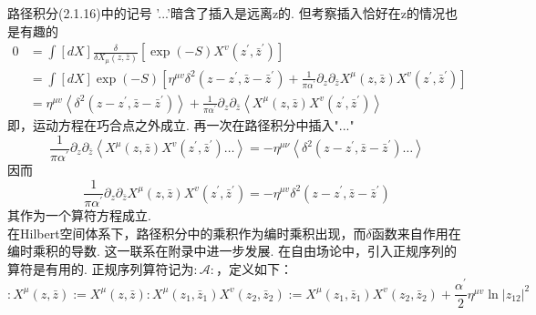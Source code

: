 路径积分(2.1.16)中的记号 '...'暗含了插入是远离z的. 但考察插入恰好在z的情况也是有趣的
\begin{equation}
\begin{aligned}
0 &=\int[d X] \frac{\delta}{\delta X_{\mu}(z, \bar{z})}\left[\exp (-S) X^{v}\left(z^{\prime}, \bar{z}^{\prime}\right)\right] \\
&=\int[d X] \exp (-S)\left[\eta^{\mu v} \delta^{2}\left(z-z^{\prime}, \bar{z}-\bar{z}^{\prime}\right)+\frac{1}{\pi \alpha^{\prime}} \partial_{z} \partial_{\bar{z}} X^{\mu}(z, \bar{z}) X^{v}\left(z^{\prime}, \bar{z}^{\prime}\right)\right]\\
&=\eta^{\mu v}\left\langle\delta^{2}\left(z-z^{\prime}, \bar{z}-\bar{z}^{\prime}\right)\right\rangle+\frac{1}{\pi \alpha^{\prime}} \partial_{z} \partial_{\bar{z}}\left\langle X^{\mu}(z, \bar{z}) X^{v}\left(z^{\prime}, \bar{z}^{\prime}\right)\right\rangle
\end{aligned}
\end{equation}
即，运动方程在巧合点之外成立. 再一次在路径积分中插入"..."
\begin{equation}
\frac{1}{\pi \alpha^{\prime}} \partial_{z} \partial_{\bar{z}}\left\langle X^{\mu}(z, \bar{z}) X^{v}\left(z^{\prime}, \bar{z}^{\prime}\right) \ldots\right\rangle=-\eta^{\mu \nu}\left\langle\delta^{2}\left(z-z^{\prime}, \bar{z}-\bar{z}^{\prime}\right) \ldots\right\rangle
\end{equation}
因而
\begin{equation}
\frac{1}{\pi \alpha^{\prime}} \partial_{z} \partial_{\bar{z}} X^{\mu}(z, \bar{z}) X^{v}\left(z^{\prime}, \bar{z}^{\prime}\right)=-\eta^{\mu v} \delta^{2}\left(z-z^{\prime}, \bar{z}-\bar{z}^{\prime}\right)
\end{equation}
其作为一个算符方程成立.\\
在Hilbert空间体系下，路径积分中的乘积作为编时乘积出现，而$\delta$函数来自作用在编时乘积的导数. 这一联系在附录中进一步发展. 在自由场论中，引入正规序列的算符是有用的. 正规序列算符记为$: \mathscr{A}:$，定义如下：
\begin{subequations}
\begin{equation}
: X^{\mu}(z, \bar{z}):=X^{\mu}(z, \bar{z})
\end{equation}
\begin{equation}
: X^{\mu}\left(z_{1}, \bar{z}_{1}\right) X^{v}\left(z_{2}, \bar{z}_{2}\right):=X^{\mu}\left(z_{1}, \bar{z}_{1}\right) X^{v}\left(z_{2}, \bar{z}_{2}\right)+\frac{\alpha^{\prime}}{2} \eta^{\mu v} \ln \left|z_{12}\right|^{2}
\end{equation}
\end{subequations}
